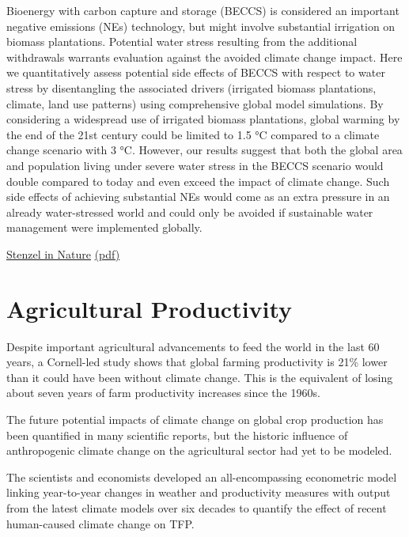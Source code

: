 \documentclass[
]{book}
\begin{document}
Bioenergy with carbon capture and storage (BECCS) is considered an important negative
emissions (NEs) technology, but might involve substantial irrigation on biomass plantations.
Potential water stress resulting from the additional withdrawals warrants evaluation against
the avoided climate change impact. Here we quantitatively assess potential side effects of
BECCS with respect to water stress by disentangling the associated drivers (irrigated biomass
plantations, climate, land use patterns) using comprehensive global model simulations.
By considering a widespread use of irrigated biomass plantations, global warming by the
end of the 21st century could be limited to 1.5 °C compared to a climate change scenario with
3 °C. However, our results suggest that both the global area and population living under
severe water stress in the BECCS scenario would double compared to today and even exceed
the impact of climate change. Such side effects of achieving substantial NEs would come as
an extra pressure in an already water-stressed world and could only be avoided if sustainable
water management were implemented globally.

\href{https://www.nature.com/articles/s41467-021-21640-3}{Stenzel in Nature}
\href{pdf/Stenzel_2021_Biomass_Plantation_Water_Stress.pdf}{(pdf)}

\hypertarget{agricultural-productivity}{%
\section{Agricultural Productivity}\label{agricultural-productivity}}

Despite important agricultural advancements to feed the world in the last 60 years, a Cornell-led study shows that global farming productivity is 21\% lower than it could have been without climate change. This is the equivalent of losing about seven years of farm productivity increases since the 1960s.

The future potential impacts of climate change on global crop production has been quantified in many scientific reports, but the historic influence of anthropogenic climate change on the agricultural sector had yet to be modeled.

The scientists and economists developed an all-encompassing econometric model linking year-to-year changes in weather and productivity measures with output from the latest climate models over six decades to quantify the effect of recent human-caused climate change on TFP.
\end{document}
